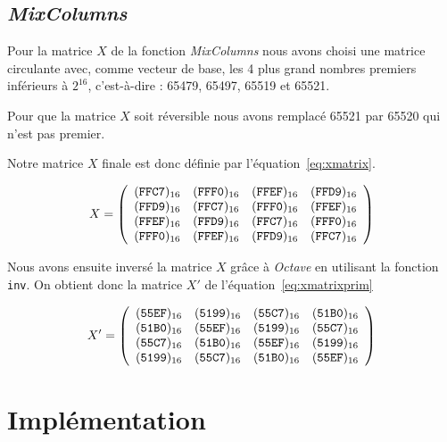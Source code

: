 \documentclass[12pt,a4paper]{report}
\begin{document}
\section{\emph{MixColumns}}

Pour la matrice $X$ de la fonction \emph{MixColumns} nous avons choisi une
matrice circulante avec, comme vecteur de base, les 4 plus grand nombres premiers
inférieurs à $2^{16}$, c'est-à-dire : 65479, 65497, 65519 et 65521.

Pour que la matrice $X$ soit réversible nous avons remplacé 65521 par 65520 qui
n'est pas premier.

Notre matrice $X$ finale est donc définie par l'équation~\ref{eq:xmatrix}.

\begin{equation}
\label{eq:xmatrix}
X = \left(
\begin{array}{cccc}
(\verb|FFC7|)_{16} & (\verb|FFF0|)_{16} & (\verb|FFEF|)_{16} & (\verb|FFD9|)_{16} \\
(\verb|FFD9|)_{16} & (\verb|FFC7|)_{16} & (\verb|FFF0|)_{16} & (\verb|FFEF|)_{16} \\
(\verb|FFEF|)_{16} & (\verb|FFD9|)_{16} & (\verb|FFC7|)_{16} & (\verb|FFF0|)_{16} \\
(\verb|FFF0|)_{16} & (\verb|FFEF|)_{16} & (\verb|FFD9|)_{16} & (\verb|FFC7|)_{16} \\
\end{array}
\right)
\end{equation}

Nous avons ensuite inversé la matrice $X$ grâce à \emph{Octave} en utilisant
la fonction \verb|inv|. On obtient donc la matrice $X'$ de l'équation~\ref{eq:xmatrixprim}

\begin{equation}
\label{eq:xmatrixprim}
X' = \left(
\begin{array}{cccc}
(\verb|55EF|)_{16} & (\verb|5199|)_{16} & (\verb|55C7|)_{16} & (\verb|51B0|)_{16} \\
(\verb|51B0|)_{16} & (\verb|55EF|)_{16} & (\verb|5199|)_{16} & (\verb|55C7|)_{16} \\
(\verb|55C7|)_{16} & (\verb|51B0|)_{16} & (\verb|55EF|)_{16} & (\verb|5199|)_{16} \\
(\verb|5199|)_{16} & (\verb|55C7|)_{16} & (\verb|51B0|)_{16} & (\verb|55EF|)_{16} \\
\end{array}
\right)
\end{equation}


\chapter{Implémentation}
\end{document}
